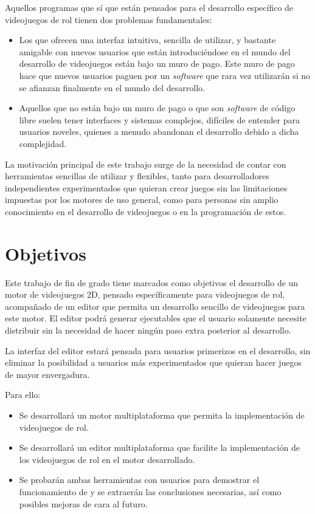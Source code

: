 \smallskip

Aquellos programas que sí que están pensados para el desarrollo específico de videojuegos de rol tienen dos problemas fundamentales:
\begin{itemize}
	\item Los que ofrecen una interfaz intuitiva, sencilla de utilizar, y bastante amigable con nuevos usuarios que están introduciéndose en el mundo del desarrollo de videojuegos están bajo un muro de pago. Este muro de pago hace que nuevos usuarios paguen por un \textit{software} que rara vez utilizarán si no se afianzan finalmente en el mundo del desarrollo.
	\item Aquellos que no están bajo un muro de pago o que son \textit{software} de código libre suelen tener interfaces y sistemas complejos, difíciles de entender para usuarios noveles, quienes a menudo abandonan el desarrollo debido a dicha complejidad.
\end{itemize}

\medskip

La motivación principal de este trabajo surge de la necesidad de contar con herramientas sencillas de utilizar y flexibles, tanto para desarrolladores independientes experimentados que quieran crear juegos sin las limitaciones impuestas por los motores de uso general, como para personas sin amplio conocimiento en el desarrollo de videojuegos o en la programación de estos.

\section{Objetivos}
Este trabajo de fin de grado tiene marcados como objetivos el desarrollo de un motor de videojuegos 2D, pensado específicamente para videojuegos de rol, acompañado de un editor que permita un desarrollo sencillo de videojuegos para este motor. El editor podrá generar ejecutables que el usuario solamente necesite distribuir sin la necesidad de hacer ningún paso extra posterior al desarrollo.

\smallskip

La interfaz del editor estará pensada para usuarios primerizos en el desarrollo, sin eliminar la posibilidad a usuarios más experimentados que quieran hacer juegos de mayor envergadura.

\medskip

Para ello:
\begin{itemize}
	\item Se desarrollará un motor multiplataforma que permita la implementación de videojuegos de rol.
	\item Se desarrollará un editor multiplataforma que facilite la implementación de los videojuegos de rol en el motor desarrollado.
	\item Se probarán ambas herramientas con usuarios para demostrar el funcionamiento de \baker{} y se extraerán las conclusiones necesarias, así como posibles mejoras de cara al futuro.
\end{itemize}

